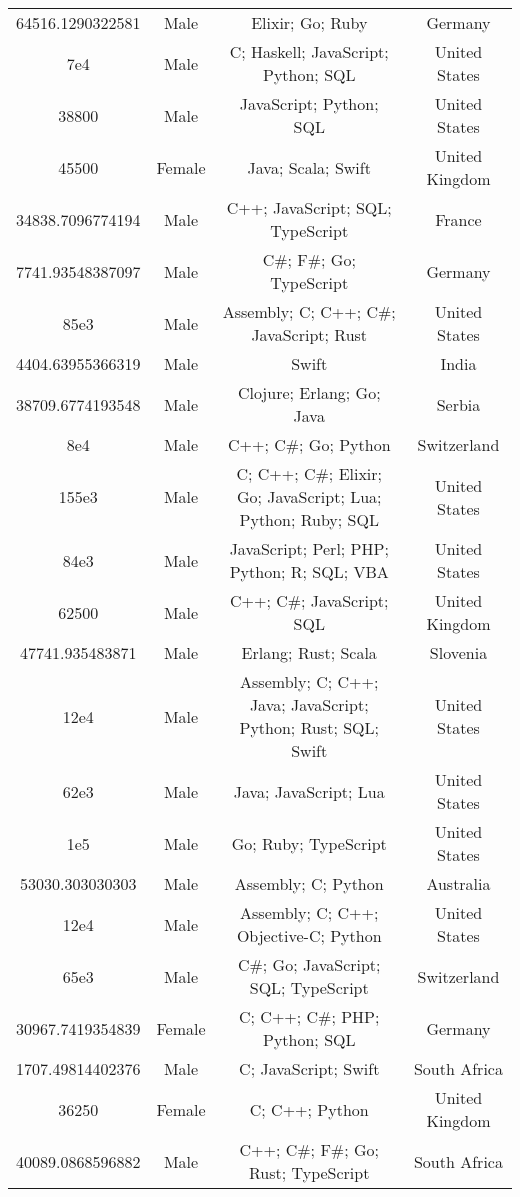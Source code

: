 \begin{center}
\begin{tabular}{ |c|c|c|c| }
64516.1290322581  &  Male  &  Elixir; Go; Ruby  &  Germany  \\ 
7e4  &  Male  &  C; Haskell; JavaScript; Python; SQL  &  United States  \\ 
38800  &  Male  &  JavaScript; Python; SQL  &  United States  \\ 
45500  &  Female  &  Java; Scala; Swift  &  United Kingdom  \\ 
34838.7096774194  &  Male  &  C++; JavaScript; SQL; TypeScript  &  France  \\ 
7741.93548387097  &  Male  &  C\#; F\#; Go; TypeScript  &  Germany  \\ 
85e3  &  Male  &  Assembly; C; C++; C\#; JavaScript; Rust  &  United States  \\ 
4404.63955366319  &  Male  &  Swift  &  India  \\ 
38709.6774193548  &  Male  &  Clojure; Erlang; Go; Java  &  Serbia  \\ 
8e4  &  Male  &  C++; C\#; Go; Python  &  Switzerland  \\ 
155e3  &  Male  &  C; C++; C\#; Elixir; Go; JavaScript; Lua; Python; Ruby; SQL  &  United States  \\ 
84e3  &  Male  &  JavaScript; Perl; PHP; Python; R; SQL; VBA  &  United States  \\ 
62500  &  Male  &  C++; C\#; JavaScript; SQL  &  United Kingdom  \\ 
47741.935483871  &  Male  &  Erlang; Rust; Scala  &  Slovenia  \\ 
12e4  &  Male  &  Assembly; C; C++; Java; JavaScript; Python; Rust; SQL; Swift  &  United States  \\ 
62e3  &  Male  &  Java; JavaScript; Lua  &  United States  \\ 
1e5  &  Male  &  Go; Ruby; TypeScript  &  United States  \\ 
53030.303030303  &  Male  &  Assembly; C; Python  &  Australia  \\ 
12e4  &  Male  &  Assembly; C; C++; Objective-C; Python  &  United States  \\ 
65e3  &  Male  &  C\#; Go; JavaScript; SQL; TypeScript  &  Switzerland  \\ 
30967.7419354839  &  Female  &  C; C++; C\#; PHP; Python; SQL  &  Germany  \\ 
1707.49814402376  &  Male  &  C; JavaScript; Swift  &  South Africa  \\ 
36250  &  Female  &  C; C++; Python  &  United Kingdom  \\ 
40089.0868596882  &  Male  &  C++; C\#; F\#; Go; Rust; TypeScript  &  South Africa  \\ 

\end{tabular}
\end{center}
